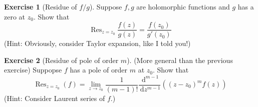 \documentclass[a4paper, 12pt]{article}
\theoremstyle{definition}
\newtheorem{exercise}{Exercise}
\numberwithin{theorem}{section}
\numberwithin{definition}{section}
\numberwithin{exercise}{section}
\numberwithin{remark}{section}
\numberwithin{figure}{section}
\numberwithin{example}{section}
\newcommand{\intd}{\,\text{d}}
\DeclareMathOperator{\res}{Res}
\begin{document}
\begin{exercise}[Residue of $f / g$]
    Suppose $f,g$ are holomorphic functions and $g$ has a zero at $z_0$.
    Show that
    \begin{equation*}
        \res_{z=z_0} \frac{f(z)}{g(z)} = \frac{f(z_0)}{g'(z_0)}
    \end{equation*}
    (Hint: Obviously, consider Taylor expansion, like I told you!)
\end{exercise}
\begin{exercise}[Residue of pole of order $m$]
    (More general than the previous exercise)
    Suppopse $f$ has a pole of order $m$ at $z_0$.
    Show that
    \begin{equation*}
        \res_{z=z_0} (f) = \lim_{z\rightarrow z_0} \frac{1}{\left( m-1 \right)!} \frac{\intd^{m-1}}{\intd z^{m-1}} \left( \left( z-z_0 \right)^m f(z) \right)
    \end{equation*}
    (Hint: Consider Laurent series of $f$.)
\end{exercise}
\end{document}
